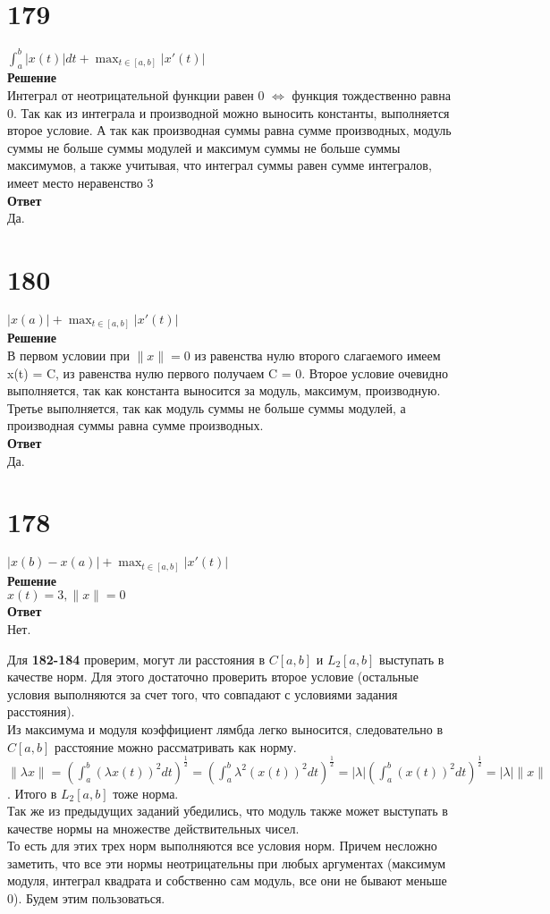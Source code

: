 \documentclass[a4paper]{article}
\begin{document}
\section*{179}
$\int_a^b |x(t)|dt + \max_{t\in [a, b]} |x'(t)|$\\
\textbf{Решение}\\
Интеграл от неотрицательной функции равен 0 $\Leftrightarrow$ функция тождественно равна 0. Так как из интеграла и производной можно выносить константы, выполняется второе условие. А так как производная суммы равна сумме производных, модуль суммы не больше суммы модулей и максимум суммы не больше суммы максимумов, а также учитывая, что интеграл суммы равен сумме интегралов, имеет место неравенство 3\\
\textbf{Ответ}\\Да.

\section*{180}
$|x(a)| + \max_{t\in [a,b]} |x'(t)|$\\
\textbf{Решение}\\
В первом условии при $\|x\| = 0$ из равенства нулю второго слагаемого имеем x(t) = C, из равенства нулю первого получаем C = 0. Второе условие очевидно выполняется, так как константа выносится за модуль, максимум, производную. Третье выполняется, так как модуль суммы не больше суммы модулей, а производная суммы равна сумме производных.\\
\textbf{Ответ}\\Да.

\section*{178}
$|x(b) - x(a)| + \max_{t\in [a, b]} |x'(t)|$\\
\textbf{Решение}\\
$x(t) = 3, \|x\| = 0$\\
\textbf{Ответ}\\Нет.


Для \textbf{182-184} проверим, могут ли расстояния в $C[a,b]$ и $L_2[a,b]$ выступать в качестве норм. Для этого достаточно проверить второе условие (остальные условия выполняются за счет того, что совпадают с условиями задания расстояния).\\ Из максимума и модуля коэффициент лямбда легко выносится, следовательно в $C[a,b]$ расстояние можно рассматривать как норму. \\$\|\lambda x\| = (\int_a^b(\lambda x(t))^2dt)^{\frac{1}{2}} = (\int_a^b\lambda^2 (x(t))^2dt)^{\frac{1}{2}} = |\lambda|(\int_a^b(x(t))^2dt)^{\frac{1}{2}} = |\lambda| \|x\|$. Итого в $L_2[a,b]$ тоже норма.\\
Так же из предыдущих заданий убедились, что модуль также может выступать в качестве нормы на множестве действительных чисел.\\
То есть для этих трех норм выполняются все условия норм. Причем несложно заметить, что все эти нормы неотрицательны при любых аргументах (максимум модуля, интеграл квадрата и собственно сам модуль, все они не бывают меньше 0). Будем этим пользоваться.\\\\
\end{document}
